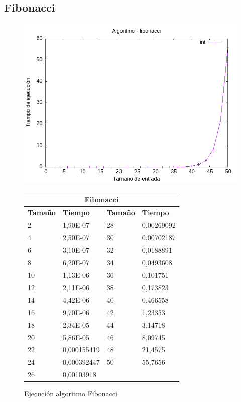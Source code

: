 \documentclass[11pt]{article}
\begin{document}
\subsection*{Fibonacci}
\begin{figure}[H]
    \begin{minipage}{0.5\textwidth}
        \centering
        \includegraphics[width=\linewidth]{assets/Img/fibonacciint.png}
        \caption{Ejecución algoritmo Fibonacci}
        \label{fig:fibonacci}
    \end{minipage}%
    \begin{minipage}{0.5\textwidth}
        \centering
        \small
        \begin{tabular}{|l|l|l|l|}
        \hline
        \multicolumn{4}{|c|}{\cellcolor{blue!20}\textbf{Fibonacci}} \\ \hline 
        \textbf{Tamaño} & \textbf{Tiempo} & \textbf{Tamaño} & \textbf{Tiempo} \\ \hline
        2 & 1,90E-07 & 28 & 0,00269092 \\ \hline
        4 & 2,50E-07 & 30 & 0,00702187 \\ \hline
        6 & 3,10E-07 & 32 & 0,0188891 \\ \hline
        8 & 6,20E-07 & 34 & 0,0493608 \\ \hline
        10 & 1,13E-06 & 36 & 0,101751 \\ \hline
        12 & 2,11E-06 & 38 & 0,173823 \\ \hline
        14 & 4,42E-06 & 40 & 0,466558 \\ \hline
        16 & 9,70E-06 & 42 & 1,23353 \\ \hline
        18 & 2,34E-05 & 44 & 3,14718 \\ \hline
        20 & 5,86E-05 & 46 & 8,09745 \\ \hline
        22 & 0,000155419 & 48 & 21,4575 \\ \hline
        24 & 0,000392447 & 50 & 55,7656 \\ \hline
        26 & 0,00103918 & ~ & \\ \hline
        \end{tabular}
    \end{minipage}
\end{figure}
\end{document}
